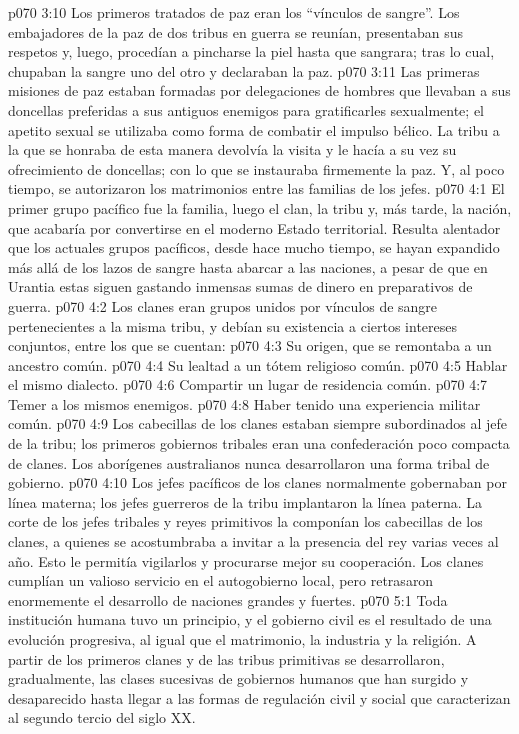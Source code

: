 \vs p070 3:10 Los primeros tratados de paz eran los “vínculos de sangre”. Los embajadores de la paz de dos tribus en guerra se reunían, presentaban sus respetos y, luego, procedían a pincharse la piel hasta que sangrara; tras lo cual, chupaban la sangre uno del otro y declaraban la paz.
\vs p070 3:11 Las primeras misiones de paz estaban formadas por delegaciones de hombres que llevaban a sus doncellas preferidas a sus antiguos enemigos para gratificarles sexualmente; el apetito sexual se utilizaba como forma de combatir el impulso bélico. La tribu a la que se honraba de esta manera devolvía la visita y le hacía a su vez su ofrecimiento de doncellas; con lo que se instauraba firmemente la paz. Y, al poco tiempo, se autorizaron los matrimonios entre las familias de los jefes.
\vs p070 4:1 El primer grupo pacífico fue la familia, luego el clan, la tribu y, más tarde, la nación, que acabaría por convertirse en el moderno Estado territorial. Resulta alentador que los actuales grupos pacíficos, desde hace mucho tiempo, se hayan expandido más allá de los lazos de sangre hasta abarcar a las naciones, a pesar de que en Urantia estas siguen gastando inmensas sumas de dinero en preparativos de guerra.
\vs p070 4:2 Los clanes eran grupos unidos por vínculos de sangre pertenecientes a la misma tribu, y debían su existencia a ciertos intereses conjuntos, entre los que se cuentan:
\vs p070 4:3 Su origen, que se remontaba a un ancestro común.
\vs p070 4:4 Su lealtad a un tótem religioso común.
\vs p070 4:5 Hablar el mismo dialecto.
\vs p070 4:6 Compartir un lugar de residencia común.
\vs p070 4:7 Temer a los mismos enemigos.
\vs p070 4:8 Haber tenido una experiencia militar común.
\vs p070 4:9 \pc Los cabecillas de los clanes estaban siempre subordinados al jefe de la tribu; los primeros gobiernos tribales eran una confederación poco compacta de clanes. Los aborígenes australianos nunca desarrollaron una forma tribal de gobierno.
\vs p070 4:10 Los jefes pacíficos de los clanes normalmente gobernaban por línea materna; los jefes guerreros de la tribu implantaron la línea paterna. La corte de los jefes tribales y reyes primitivos la componían los cabecillas de los clanes, a quienes se acostumbraba a invitar a la presencia del rey varias veces al año. Esto le permitía vigilarlos y procurarse mejor su cooperación. Los clanes cumplían un valioso servicio en el autogobierno local, pero retrasaron enormemente el desarrollo de naciones grandes y fuertes.
\vs p070 5:1 Toda institución humana tuvo un principio, y el gobierno civil es el resultado de una evolución progresiva, al igual que el matrimonio, la industria y la religión. A partir de los primeros clanes y de las tribus primitivas se desarrollaron, gradualmente, las clases sucesivas de gobiernos humanos que han surgido y desaparecido hasta llegar a las formas de regulación civil y social que caracterizan al segundo tercio del siglo XX.
